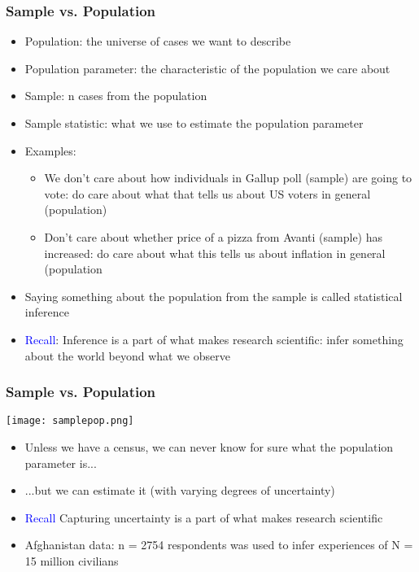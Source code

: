 \documentclass{beamer}
\newcommand{\blue}{\textcolor{blue}}
\begin{document}
\begin{frame}
 \frametitle{Sample vs. Population}
 \begin{minipage}{.35\linewidth}
 \begin{itemize}[<+->]
   \item Population: the universe of cases we want to describe
   \item Population parameter: the characteristic of the population we care about
   \item Sample: n cases from the population
   \item Sample statistic: what we use to estimate the population parameter
 \end{itemize}
 \end{minipage}\hfill
 \begin{minipage}{.64\linewidth}
 \begin{itemize}[<+->]
   \item Examples:
      \begin{itemize}
        \item We don't care about how individuals in Gallup poll (sample) are going to vote: do care about what that tells us about US voters in general (population)
        \item Don't care about whether price of a pizza from Avanti (sample) has increased: do care about what this tells us about inflation in general (population
      \end{itemize}
    \item Saying something about the population from the sample is called \alert{statistical inference}
    \item \blue{Recall}: Inference is a part of what makes research scientific: infer something about the world beyond what we observe
 \end{itemize}
 \end{minipage}
\end{frame}

\begin{frame}
 \frametitle{Sample vs. Population}
 \begin{minipage}{.48\linewidth}
 \texttt{[image: samplepop.png]}
 \pause
 \end{minipage}\hfill
 \begin{minipage}{.48\linewidth}
 \begin{itemize}[<+->]
   \item Unless we have a census, we can never know \alert{for sure} what the population parameter is...
   \item ...but we can \alert{estimate} it (with varying degrees of uncertainty)
   \item \blue{Recall} Capturing uncertainty is a part of what makes research scientific
   \item Afghanistan data: n = 2754 respondents was used to infer experiences of N = 15 million civilians
 \end{itemize}
 \end{minipage}
\end{frame}
\end{document}
